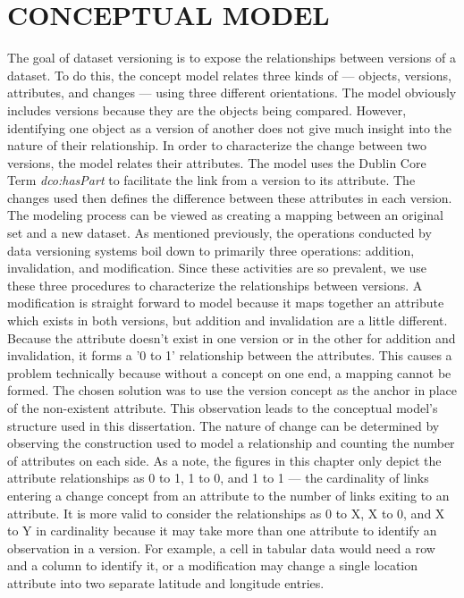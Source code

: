 
\chapter{CONCEPTUAL MODEL}\label{ch:model}

The goal of dataset versioning is to expose the relationships between versions of a dataset.
To do this, the concept model relates three kinds of --- objects, versions, attributes, and changes --- using three different orientations.
The model obviously includes versions because they are the objects being compared.
However, identifying one object as a version of another does not give much insight into the nature of their relationship.
In order to characterize the change between two versions, the model relates their attributes.
The model uses the Dublin Core Term \textit{dco:hasPart} to facilitate the link from a version to its attribute.
The changes used then defines the difference between these attributes in each version.
The modeling process can be viewed as creating a mapping between an original set and a new dataset.
As mentioned previously, the operations conducted by data versioning systems boil down to primarily three operations: addition, invalidation, and modification.
Since these activities are so prevalent, we use these three procedures to characterize the relationships between versions.
A modification is straight forward to model because it maps together an attribute which exists in both versions, but addition and invalidation are a little different.
Because the attribute doesn't exist in one version or in the other for addition and invalidation, it forms a '0 to 1' relationship between the attributes.
This causes a problem technically because without a concept on one end, a mapping cannot be formed.
The chosen solution was to use the version concept as the anchor in place of the non-existent attribute.
This observation leads to the conceptual model's structure used in this dissertation.
The nature of change can be determined by observing the construction used to model a relationship and counting the number of attributes on each side.
As a note, the figures in this chapter only depict the attribute relationships as 0 to 1, 1 to 0, and 1 to 1 --- the cardinality of links entering a change concept from an attribute to the number of links exiting to an attribute.
It is more valid to consider the relationships as 0 to X, X to 0, and X to Y in cardinality because it may take more than one attribute to identify an observation in a version.
For example, a cell in tabular data would need a row and a column to identify it, or a modification may change a single location attribute into two separate latitude and longitude entries.

